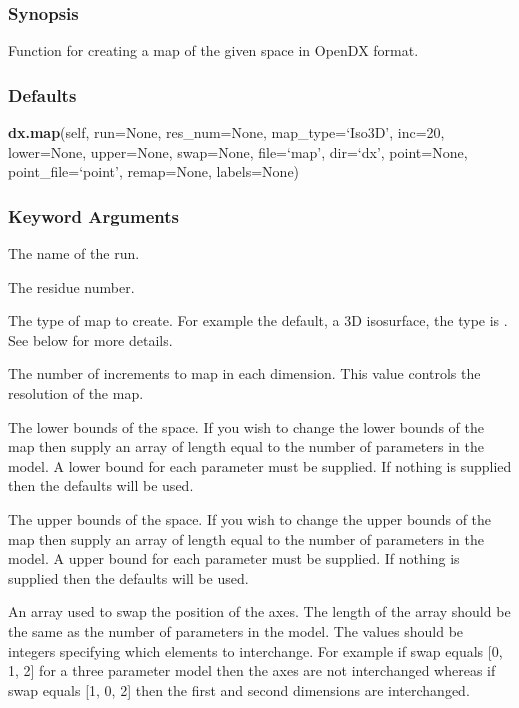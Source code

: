 \subsubsection{Synopsis}

Function for creating a map of the given space in OpenDX format.



\subsubsection{Defaults}

\textsf{\textbf{dx.map}(self, run=None, res\_num=None, map\_type=`Iso3D', inc=20, lower=None, upper=None, swap=None, file=`map', dir=`dx', point=None, point\_file=`point', remap=None, labels=None)}


\subsubsection{Keyword Arguments}

  The name of the run. 

  The residue number. 

  The type of map to create.  For example the default, a 3D isosurface, the type is .  See below for more details. 

  The number of increments to map in each dimension.  This value controls the resolution of the map. 

  The lower bounds of the space.  If you wish to change the lower bounds of the map then supply an array of length equal to the number of parameters in the model.  A lower bound for each parameter must be supplied.  If nothing is supplied then the defaults will be used. 

  The upper bounds of the space.  If you wish to change the upper bounds of the map then supply an array of length equal to the number of parameters in the model.  A upper bound for each parameter must be supplied.  If nothing is supplied then the defaults will be used. 

  An array used to swap the position of the axes.  The length of the array should be the same as the number of parameters in the model.  The values should be integers specifying which elements to interchange.  For example if swap equals [0, 1, 2] for a three parameter model then the axes are not interchanged whereas if swap equals [1, 0, 2] then the first and second dimensions are interchanged. 

